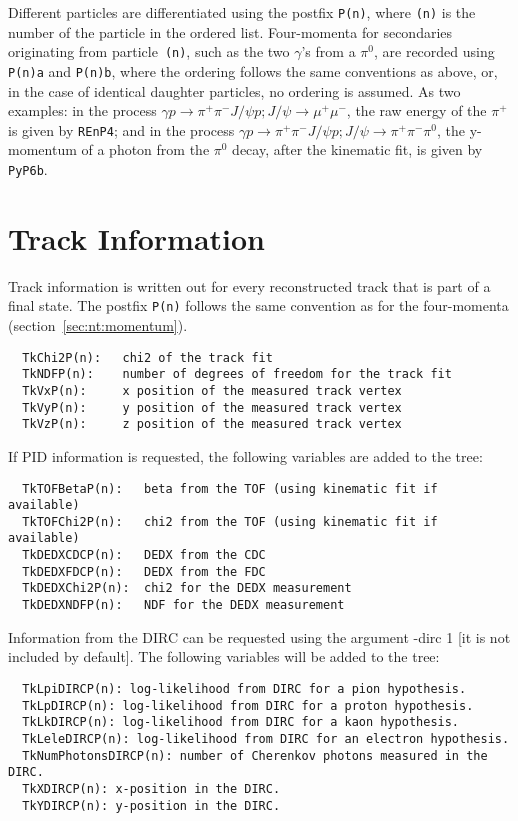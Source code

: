 \documentclass[11pt]{article}
\begin{document}
Different particles are differentiated using the postfix {\tt P(n)}, where {\tt (n)} is the number of the particle in the ordered list.  Four-momenta for secondaries originating from particle~{\tt (n)}, such as the two $\gamma$'s from a $\pi^0$, are recorded using {\tt P(n)a} and {\tt P(n)b}, where the ordering follows the same conventions as above, or, in the case of identical daughter particles, no ordering is assumed.  As two examples: in the process $\gamma p \to\pi^+\pi^-J/\psi p; J/\psi\to\mu^+\mu^-$, the raw energy of the $\pi^+$ is given by {\tt REnP4}; and in the process $\gamma p \to \pi^+\pi^-J/\psi p; J/\psi\to\pi^+\pi^-\pi^0$, the y-momentum of a photon from the $\pi^0$ decay, after the kinematic fit, is given by {\tt PyP6b}.




\section{Track Information}
\label{sec:nt:track}

Track information is written out for every reconstructed track that is part of a final state.  The postfix {\tt P(n)} follows the same convention as for the four-momenta (section~\ref{sec:nt:momentum}).
\begin{verbatim}
  TkChi2P(n):   chi2 of the track fit
  TkNDFP(n):    number of degrees of freedom for the track fit
  TkVxP(n):     x position of the measured track vertex
  TkVyP(n):     y position of the measured track vertex
  TkVzP(n):     z position of the measured track vertex
\end{verbatim}

If PID information is requested, the following variables are added to the tree:
\begin{verbatim}
  TkTOFBetaP(n):   beta from the TOF (using kinematic fit if available)
  TkTOFChi2P(n):   chi2 from the TOF (using kinematic fit if available)
  TkDEDXCDCP(n):   DEDX from the CDC
  TkDEDXFDCP(n):   DEDX from the FDC
  TkDEDXChi2P(n):  chi2 for the DEDX measurement
  TkDEDXNDFP(n):   NDF for the DEDX measurement
\end{verbatim}

Information from the DIRC can be requested using the argument -dirc 1 [it is not included by default]. The following variables will be added to the tree:
\begin{verbatim}
  TkLpiDIRCP(n): log-likelihood from DIRC for a pion hypothesis.
  TkLpDIRCP(n): log-likelihood from DIRC for a proton hypothesis.
  TkLkDIRCP(n): log-likelihood from DIRC for a kaon hypothesis.
  TkLeleDIRCP(n): log-likelihood from DIRC for an electron hypothesis.
  TkNumPhotonsDIRCP(n): number of Cherenkov photons measured in the DIRC.
  TkXDIRCP(n): x-position in the DIRC.
  TkYDIRCP(n): y-position in the DIRC.
\end{verbatim}
\end{document}

